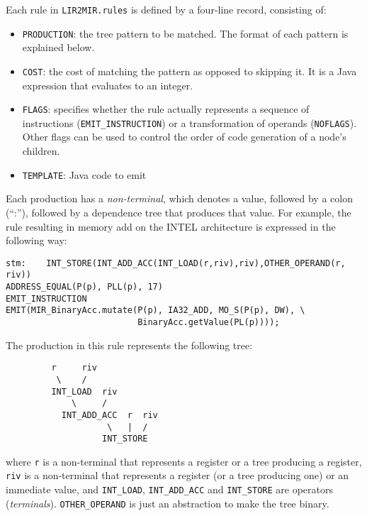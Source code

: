 Each rule in {\tt LIR2MIR.rules} is defined by a four-line record,
consisting of:
\begin{itemize}
\item {\tt PRODUCTION}: the tree pattern to be matched.  The format of each
pattern is explained below.
\item {\tt COST}: the cost of matching the pattern as opposed to skipping
it.  It is a Java\TMweb{} expression that evaluates to an integer.
\item {\tt FLAGS}: specifies whe\-ther the rule actually represents a sequence
of instructions (\texttt{E\-MIT\_\-IN\-STRUC\-TION}) or a transformation of operands
(\texttt{NO\-FLAGS}). Other flags can be used to control the order of code
generation of a node's children.
\item {\tt TEMPLATE}: Java code to emit
\end{itemize}

Each production has a {\em non-terminal}, which denotes a value, followed
by a colon (``:''), followed by a dependence tree that produces that value.
For example, the rule resulting in memory add on the INTEL architecture is
expressed in the following way:
\begin{verbatim}
stm:    INT_STORE(INT_ADD_ACC(INT_LOAD(r,riv),riv),OTHER_OPERAND(r, riv))
ADDRESS_EQUAL(P(p), PLL(p), 17)
EMIT_INSTRUCTION
EMIT(MIR_BinaryAcc.mutate(P(p), IA32_ADD, MO_S(P(p), DW), \
                          BinaryAcc.getValue(PL(p))));
\end{verbatim}
The production in this rule represents the following tree:
\begin{verbatim}
         r     riv
          \    /
         INT_LOAD  riv
             \     /
           INT_ADD_ACC  r  riv
                    \   |  /
                   INT_STORE
\end{verbatim}
where {\tt r} is a non-terminal that represents a register or a tree
producing a register, {\tt riv} is a non-terminal that represents a register
(or a tree producing one) or an immediate value, and {\tt INT\_LOAD},
{\tt INT\_ADD\_ACC} and {\tt INT\_STORE} are operators ({\em terminals}).
{\tt OTHER\_OPERAND} is just an abstraction to make the tree binary.

